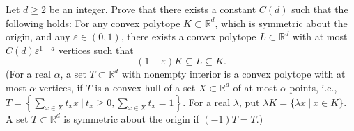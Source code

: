 \documentclass{article}
\begin{document}
\setlength{\parindent}{0pt}
Let \(\displaystyle d\ge 2\) be an integer. Prove that there exists a constant \(\displaystyle C(d)\) such that the following holds: For any convex polytope \(\displaystyle K\subset \mathbb{R}^d\), which is symmetric about the origin, and any \(\displaystyle \varepsilon\in (0,1)\), there exists a convex polytope \(\displaystyle L\subset \mathbb R^d\) with at most \(\displaystyle C(d)\varepsilon^{1-d}\) vertices such that $$(1-\varepsilon)K\subseteq L \subseteq K.$$(For a real \(\displaystyle \alpha\), a set \(\displaystyle T\subset \mathbb{R}^d\) with nonempty interior is a convex polytope with at most \(\displaystyle \alpha\) vertices, if \(\displaystyle T\) is a convex hull of a set \(\displaystyle X\subset\mathbb R^d\) of at most \(\displaystyle \alpha\) points, i.e., \(\displaystyle T=\left\{\sum_{x\in X} t_xx\ |\ t_x\ge 0, \sum_{x\in X} t_x = 1\right\}\). For a real \(\displaystyle \lambda\), put \(\displaystyle \lambda K=\{\lambda x\ |\ x\in K\}\). A set \(\displaystyle T\subset \mathbb{R}^d\) is symmetric about the origin if \(\displaystyle (-1) T = T\).)  
\end{document}
